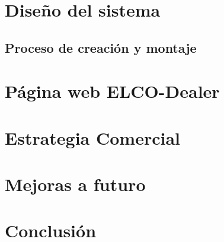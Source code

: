 \documentclass[a4paper, 11pt]{article}
\begin{document}
\newpage
\section{Diseño del sistema}


\subsection{Proceso de creación y montaje}



\newpage
\section{Página web ELCO-Dealer}


\newpage
\section{Estrategia Comercial}


\newpage
\section{Mejoras a futuro}


\nocite{*}

\newpage
\section{Conclusión}




\newpage
\begingroup
\sloppy


\endgroup
\end{document}

